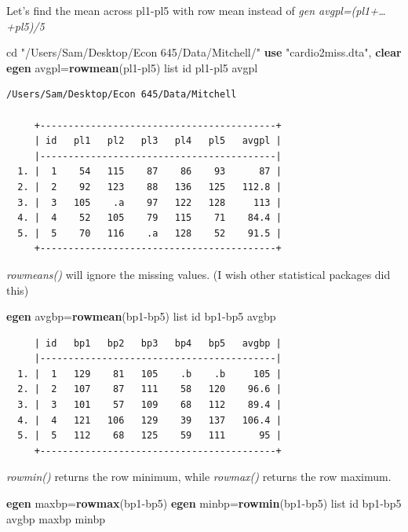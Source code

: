 \documentclass[
]{book}
\newenvironment{Shaded}{\begin{snugshade}}{\end{snugshade}}
\newcommand{\FunctionTok}[1]{\textcolor[rgb]{0.13,0.29,0.53}{\textbf{#1}}}
\newcommand{\KeywordTok}[1]{\textcolor[rgb]{0.13,0.29,0.53}{\textbf{#1}}}
\newcommand{\NormalTok}[1]{#1}
\newcommand{\OtherTok}[1]{\textcolor[rgb]{0.56,0.35,0.01}{#1}}
\newcommand{\StringTok}[1]{\textcolor[rgb]{0.31,0.60,0.02}{#1}}
\begin{document}
Let's find the mean across pl1-pl5 with row mean instead of \emph{gen avgpl=(pl1+\ldots+pl5)/5}

\begin{Shaded}
\begin{Highlighting}[]
\NormalTok{cd }\StringTok{"/Users/Sam/Desktop/Econ 645/Data/Mitchell/"}
\KeywordTok{use} \StringTok{"cardio2miss.dta"}\NormalTok{, }\KeywordTok{clear}
\KeywordTok{egen}\NormalTok{ avgpl=}\FunctionTok{rowmean}\NormalTok{(pl1{-}pl5)}
\OtherTok{list}\NormalTok{ id pl1{-}pl5 avgpl}
\end{Highlighting}
\end{Shaded}

\begin{verbatim}
/Users/Sam/Desktop/Econ 645/Data/Mitchell

     +------------------------------------------+
     | id   pl1   pl2   pl3   pl4   pl5   avgpl |
     |------------------------------------------|
  1. |  1    54   115    87    86    93      87 |
  2. |  2    92   123    88   136   125   112.8 |
  3. |  3   105    .a    97   122   128     113 |
  4. |  4    52   105    79   115    71    84.4 |
  5. |  5    70   116    .a   128    52    91.5 |
     +------------------------------------------+
\end{verbatim}

\emph{rowmeans()} will ignore the missing values. (I wish other statistical packages did this)

\begin{Shaded}
\begin{Highlighting}[]
\KeywordTok{egen}\NormalTok{ avgbp=}\FunctionTok{rowmean}\NormalTok{(bp1{-}bp5)}
\OtherTok{list}\NormalTok{ id bp1{-}bp5 avgbp}
\end{Highlighting}
\end{Shaded}

\begin{verbatim}
     | id   bp1   bp2   bp3   bp4   bp5   avgbp |
     |------------------------------------------|
  1. |  1   129    81   105    .b    .b     105 |
  2. |  2   107    87   111    58   120    96.6 |
  3. |  3   101    57   109    68   112    89.4 |
  4. |  4   121   106   129    39   137   106.4 |
  5. |  5   112    68   125    59   111      95 |
     +------------------------------------------+
\end{verbatim}

\emph{rowmin()} returns the row minimum, while \emph{rowmax()} returns the row maximum.

\begin{Shaded}
\begin{Highlighting}[]
\KeywordTok{egen}\NormalTok{ maxbp=}\FunctionTok{rowmax}\NormalTok{(bp1{-}bp5)}
\KeywordTok{egen}\NormalTok{ minbp=}\FunctionTok{rowmin}\NormalTok{(bp1{-}bp5)}
\OtherTok{list}\NormalTok{ id bp1{-}bp5 avgbp maxbp minbp}
\end{Highlighting}
\end{Shaded}
\end{document}
